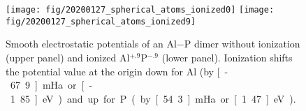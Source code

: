 \documentclass[oribibl]{llncs}
\begin{document}
\begin{figure}
  \begin{minipage}[c]{.990\textwidth}
	\texttt{[image: fig/20200127\_spherical\_atoms\_ionized0]} %
	\texttt{[image: fig/20200127\_spherical\_atoms\_ionized9]} %
  \end{minipage}\hfill
  \begin{minipage}[c]{.009\textwidth}
  \end{minipage}
  \label{fig:ionized-spherical-atoms-AlP-dimer}
  \caption{
   Smooth electrostatic potentials of an Al$-$P dimer 
   without ionization (upper panel) and ionized Al$^{+.9}$P$^{-.9}$ (lower panel).
   Ionization shifts the potential value at the origin down for Al (by \unit[-67.9]{mHa} or \unit[-1.85]{eV})
   and up for P (by \unit[54.3]{mHa} or \unit[1.47]{eV}).
   }
\end{figure}


\newpage
\end{document}
